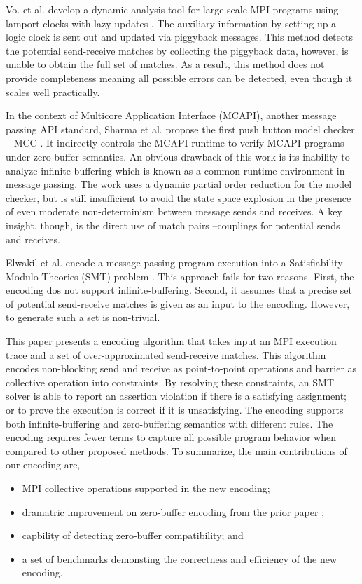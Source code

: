 Vo. et al. develop a dynamic analysis tool for large-scale MPI programs using lamport clocks with lazy updates \cite{}. The auxiliary information by setting up a logic clock is sent out and updated via piggyback messages. This method detects the potential send-receive matches by collecting the piggyback data, however, is unable to obtain the full set of matches. As a result, this method does not provide completeness meaning all possible errors can be detected, even though it scales well practically.

In the context of Multicore Application Interface (MCAPI), another message passing API standard, Sharma et al. propose the first push button model checker -- MCC \cite{}. It indirectly controls the MCAPI runtime to verify MCAPI programs under zero-buffer semantics. An obvious drawback of this work is its inability to analyze infinite-buffering which is known as a common runtime environment in message passing. The work uses a dynamic partial order reduction for the model checker, but is still insufficient to avoid the state space explosion in the presence of even moderate non-determinism between message sends and receives. A key insight, though, is the direct use of match pairs --couplings for potential sends and receives.

Elwakil et al. encode a message passing program execution into a Satisfiability Modulo Theories (SMT) problem \cite{}. This approach fails for two reasons. First, the encoding dos not support infinite-buffering. Second, it assumes that a precise set of potential send-receive matches is given as an input to the encoding. However, to generate such a set is non-trivial.

This paper presents a encoding algorithm that takes input an MPI execution trace and a set of over-approximated send-receive matches. This algorithm encodes non-blocking send and receive as point-to-point operations and barrier as collective operation into constraints. By resolving these constraints, an SMT solver is able to report an assertion violation if there is a satisfying assignment; or to prove the execution is correct if it is unsatisfying.  The encoding supports both infinite-buffering and zero-buffering semantics with different rules. The encoding requires fewer terms to capture all possible program behavior when compared to other proposed methods. To summarize, the main contributions of our encoding are,
\begin{itemize}
\item  MPI collective operations supported in the new encoding;
\item dramatric improvement on zero-buffer encoding from the prior paper \cite{};
\item capbility of detecting zero-buffer compatibility; and
\item a set of benchmarks demonsting the correctness and efficiency of the new encoding.
\end{itemize}

